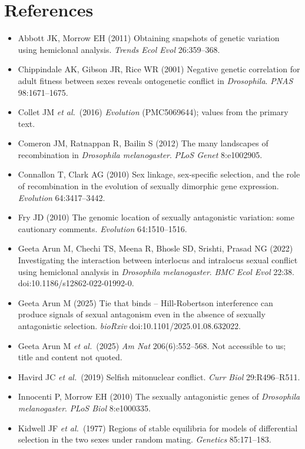 \chapter*{References}
\small
\begin{itemize}[leftmargin=*,label={}]
\item Abbott JK, Morrow EH (2011) Obtaining snapshots of genetic variation using hemiclonal analysis. \emph{Trends Ecol Evol} 26:359--368.
\item Chippindale AK, Gibson JR, Rice WR (2001) Negative genetic correlation for adult fitness between sexes reveals ontogenetic conflict in \emph{Drosophila}. \emph{PNAS} 98:1671--1675.
\item Collet JM \emph{et al.}\ (2016) \emph{Evolution} (PMC5069644); values from the primary text.
\item Comeron JM, Ratnappan R, Bailin S (2012) The many landscapes of recombination in \emph{Drosophila melanogaster}. \emph{PLoS Genet} 8:e1002905.
\item Connallon T, Clark AG (2010) Sex linkage, sex-specific selection, and the role of recombination in the evolution of sexually dimorphic gene expression. \emph{Evolution} 64:3417--3442.
\item Fry JD (2010) The genomic location of sexually antagonistic variation: some cautionary comments. \emph{Evolution} 64:1510--1516.
\item Geeta Arun M, Chechi TS, Meena R, Bhosle SD, Srishti, Prasad NG (2022) Investigating the interaction between interlocus and intralocus sexual conflict using hemiclonal analysis in \emph{Drosophila melanogaster}. \emph{BMC Ecol Evol} 22:38. doi:10.1186/s12862-022-01992-0.
\item Geeta Arun M (2025) Tie that binds -- Hill-Robertson interference can produce signals of sexual antagonism even in the absence of sexually antagonistic selection. \emph{bioRxiv} doi:10.1101/2025.01.08.632022.
\item Geeta Arun M \emph{et al.}\ (2025) \emph{Am Nat} 206(6):552--568. Not accessible to us; title and content not quoted.
\item Havird JC \emph{et al.}\ (2019) Selfish mitonuclear conflict. \emph{Curr Biol} 29:R496--R511.
\item Innocenti P, Morrow EH (2010) The sexually antagonistic genes of \emph{Drosophila melanogaster}. \emph{PLoS Biol} 8:e1000335.
\item Kidwell JF \emph{et al.}\ (1977) Regions of stable equilibria for models of differential selection in the two sexes under random mating. \emph{Genetics} 85:171--183.

\end{itemize}
